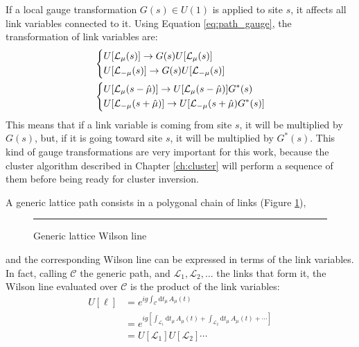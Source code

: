 If a local gauge transformation $G(s) \in U(1)$ is applied to site $s$, it affects all link variables connected to it.
Using Equation \eqref{eq:path_gauge}, the transformation of link variables are:
\begin{equation}\label{eq:site_gauge}
    \begin{aligned}
        &\begin{dcases}
            U[\mathcal L_\mu(s)] \rightarrow G(s)U[\mathcal L_\mu(s)] \\
            U[\mathcal L_{-\mu}(s)] \rightarrow G(s)U[\mathcal L_{-\mu}(s)]
        \end{dcases} \\
        &\begin{dcases}
            U[\mathcal L_\mu(s-\hat\mu)] \rightarrow U[\mathcal L_\mu(s-\hat\mu)]G^*(s) \\
            U[\mathcal L_{-\mu}(s+\hat\mu)] \rightarrow U[\mathcal L_{-\mu}(s+\hat\mu)G^*(s)]
        \end{dcases}
    \end{aligned}
\end{equation}
This means that if a link variable is coming from site $s$, it will be multiplied by $G(s)$, but,
if it is going toward site $s$, it will be multiplied by $G^*(s)$.
This kind of gauge transformations are very important for this work, because the cluster algorithm described in Chapter \ref{ch:cluster}
will perform a sequence of them before being ready for cluster inversion.

A generic lattice path consists in a polygonal chain of links (Figure \ref{fig:path}),
\begin{figure}[!htb]
    \centering
    \rule{3in}{1.5in}
    \caption{Generic lattice Wilson line}
    \label{fig:path}
\end{figure}
and the corresponding Wilson line can be expressed in terms of the link variables.
In fact, calling $\mathcal C$ the generic path, and $\mathcal L_1, \mathcal L_2, \ldots$ the links that form it,
the Wilson line evaluated over $\mathcal C$ is the product of the link variables:
\begin{align*}
    U[\ell] &= e^{ig\int_{\mathcal C}\mathrm dt_\mu\,A_\mu(t)} \\
            &= e^{ig\left[\int_{\mathcal L_1}\mathrm dt_\mu\,A_\mu(t) + \int_{\mathcal L_2}\mathrm dt_\mu\,A_\mu(t) + \cdots \right]} \\
            &= U[\mathcal L_1]U[\mathcal L_2] \cdots
\end{align*}

